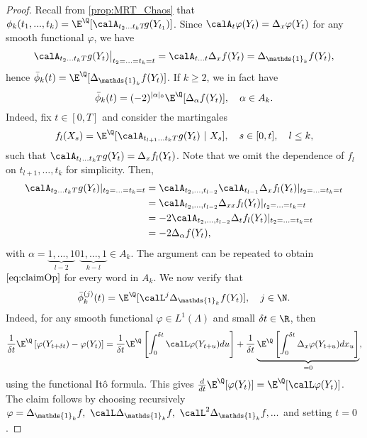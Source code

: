 \begin{proof}
Recall from  \cref{prop:MRT_Chaos} that 
$\phi_k(t_1,...,t_k) = \E^{\Q}[\calA_{t_2...t_kT} \! g(Y_{t_1})]$. %
Since $\calA_t \varphi(Y_t) = \Delta_x \varphi(Y_t)$ for any smooth functional $\varphi$, we have  $$\calA_{t_2...t_kT} g(Y_t)\big | _{t_2  =  \ldots  =  t_k =  t} = \calA_{t...t} \Delta_x f(Y_t) =\Delta_{\mathds{1}_k}f(Y_t),  $$
hence $\bar{\phi}_k(t) = \E^{\Q}[\Delta_{\mathds{1}_k} f(Y_t)]$. If $k\ge 2$, we in fact have \begin{equation}\label{eq:claimOp}
    \bar{\phi}_k(t) = (-2)^{|\alpha|_0}\E^{\Q}[\Delta_{\alpha} f(Y_t)], \quad \alpha \in A_k. 
\end{equation}
  Indeed, fix  $t\in[0,T]$ and consider the martingales 
$$f_{l}(X_s) = 
\E^{\Q}[\calA_{t_{l+1}...t_{k}T} g(Y_t)\ | \ X_s] , \quad s\in [0,t], \quad l \le k,$$ 
such that $ \calA_{t_l...t_kT} g(Y_t) =  \Delta_x  f_{l}(Y_t)$. Note that we omit the dependence of $f_l$ on $t_{l+1},\ldots,t_k$ for simplicity. 
Then, 
\begin{align*}
    \calA_{t_2...t_kT} g(Y_t)| _{t_2  =  \ldots  =  t_k =  t} 
    &= \calA_{t_2,...,t_{l-2}}  \calA_{t_{l-1}} \Delta_x  f_{l}(Y_t)| _{t_2  =  \ldots  =  t_k =  t} \\ 
    &= \calA_{t_2,...,t_{l-2}} \Delta_{xx} f_{l}(Y_t)| _{t_2  =  \ldots  =  t_k =  t}\\ 
    &= -2 \calA_{t_2,...,t_{l-2}} \Delta_{t} f_{l}(Y_t)| _{t_2  =  \ldots  =  t_k =  t} \\
    &= -2 \Delta_{\alpha}f(Y_t),
\end{align*}
with $\alpha = \underbrace{1,...,1}_{l-2} 0\underbrace{1,...,1}_{k-l} \in A_k$. The argument can be repeated to obtain $\eqref{eq:claimOp}$ for every word in  $A_k$.  
We now  verify that $$\bar{\phi}^{(j)}_k(t) = \E^{\Q}[\calL^j \Delta_{\mathds{1}_k} f(Y_t)], \quad j \in \N. $$ 
Indeed, for any smooth functional $\varphi \in L^1(\Lambda)$ and small $\delta t \in \R $, then 
\begin{align*}
    \frac{1}{\delta t} \E^{\Q}\left[\varphi(Y_{t+\delta t}) - \varphi(Y_t)\right] =  \frac{1}{\delta t} \E^{\Q}\left[  \int_{0}^{\delta t} \calL \varphi(Y_{t+u}) du\right] + \frac{1}{\delta t} \underbrace{\E^{\Q}\left[  \int_{0}^{\delta t} \Delta_x \varphi(Y_{t+u}) dx_u\right] }_{=0}, 
\end{align*}
using the functional It\^o formula. 
This gives $\frac{d}{dt} \E^{\Q}[\varphi(Y_t)] = \E^{\Q}[ \calL \varphi(Y_t)]$. The claim follows by choosing recursively $\varphi = \Delta_{\mathds{1}_k} f, \ \calL \Delta_{\mathds{1}_k} f, \ \calL^2\Delta_{\mathds{1}_k} f,... $  and setting $t=0$.    

  
 \end{proof}
 
